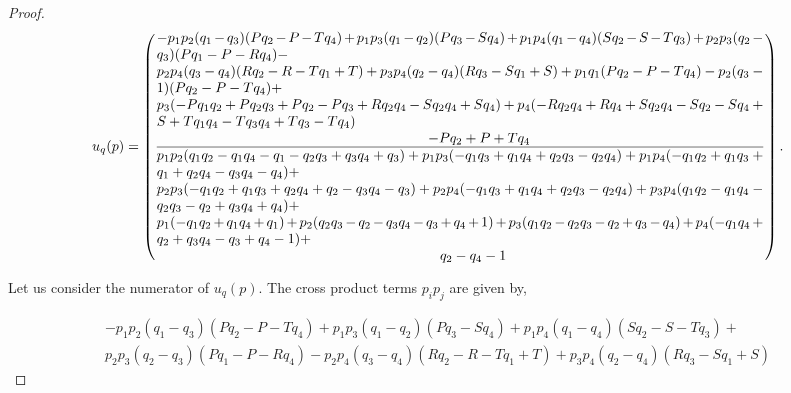 \documentclass[10pt]{article}
\begin{document}
\begin{proof}
    \begingroup
    \scriptsize
    \begin{equation*}
        u_q(p) =
        \left(
          \frac
            {\parbox{6in}{$ - p_{1} p_{2} (q_{1} - q_{3}) (P q_{2} - P - T q_{4}) + p_{1} p_{3} (q_{1} - q_{2}) (P q_{3} - S q_{4}) + p_{1} p_{4} (q_{1} - q_{4}) (S q_{2} - S - T q_{3}) + p_{2} p_{3} (q_{2} - q_{3}) (P q_{1} - P - R q_{4}) - $ \\
            $ p_{2} p_{4} (q_{3} - q_{4}) (R q_{2} - R - T q_{1} + T) + p_{3} p_{4} (q_{2} - q_{4}) (R q_{3} - S q_{1} + S) + p_{1} q_{1} (P q_{2} - P - T q_{4}) - p_{2} (q_{3} - 1) (P q_{2} - P - T q_{4}) + $ \\
            $ p_{3} (- P q_{1} q_{2} + P q_{2} q_{3} + P q_{2} - P q_{3} + R q_{2} q_{4} - S q_{2} q_{4} + S q_{4}) + p_{4} (- R q_{2} q_{4} + R q_{4} + S q_{2} q_{4} - S q_{2} - S q_{4} + S + T q_{1} q_{4} - T q_{3} q_{4} + T q_{3} - T q_{4}) $ \\
            \hspace*{6.7cm} $- P q_{2} + P + T q_{4}$
            }}
            {\parbox{6in}{$
            p_{1} p_{2} (q_{1} q_{2} - q_{1} q_{4} - q_{1} - q_{2} q_{3} + q_{3} q_{4} + q_{3}) + p_{1} p_{3} (- q_{1} q_{3} + q_{1} q_{4} + q_{2} q_{3} - q_{2} q_{4}) + p_{1} p_{4} (- q_{1} q_{2} + q_{1} q_{3} + q_{1} + q_{2} q_{4} - q_{3} q_{4} - q_{4}) +$ \\
            $ p_{2} p_{3} (- q_{1} q_{2} + q_{1} q_{3} + q_{2} q_{4} + q_{2} - q_{3} q_{4} - q_{3}) + p_{2} p_{4} (- q_{1} q_{3} + q_{1} q_{4} + q_{2} q_{3} - q_{2} q_{4}) + p_{3} p_{4} (q_{1} q_{2} - q_{1} q_{4} - q_{2} q_{3} - q_{2} + q_{3} q_{4} + q_{4}) + $ \\
            $ p_{1} (- q_{1} q_{2} + q_{1} q_{4} + q_{1}) + p_{2} (q_{2} q_{3} - q_{2} - q_{3} q_{4} - q_{3} + q_{4} + 1) + p_{3} (q_{1} q_{2} - q_{2} q_{3} - q_{2} + q_{3} - q_{4}) + p_{4} (- q_{1} q_{4} + q_{2} + q_{3} q_{4} - q_{3} + q_{4} - 1) + $ \\
            \hspace*{7cm} $q_{2} - q_{4} - 1$
          }}
        \right).
    \end{equation*}
    \endgroup

    Let us consider the numerator of \(u_q(p)\). The cross product terms
    \(p_ip_j\) are given by,

    \begingroup
    \footnotesize
    \begin{align*}
    - p_{1} p_{2} (q_{1} - q_{3}) (P q_{2} - P - T q_{4}) + p_{1} p_{3} (q_{1} - q_{2}) (P q_{3} - S q_{4}) + p_{1} p_{4} (q_{1} - q_{4}) (S q_{2} - S - T q_{3}) + \\
    p_{2} p_{3} (q_{2} - q_{3}) (P q_{1} - P - R q_{4}) - p_{2} p_{4} (q_{3} - q_{4}) (R q_{2} - R - T q_{1} + T) + p_{3} p_{4} (q_{2} - q_{4}) (R q_{3} - S q_{1} + S)
    \end{align*}
    \endgroup


\end{proof}
\end{document}
